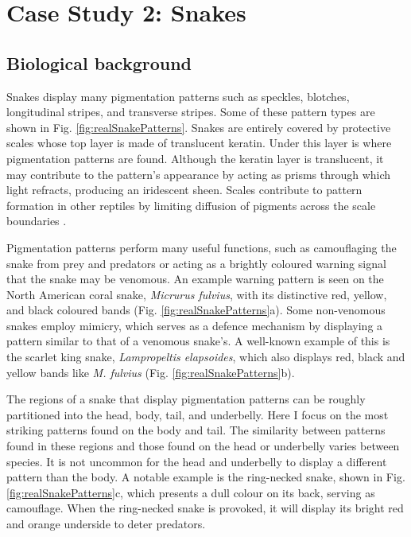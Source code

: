 \chapter{Case Study 2: Snakes}
\section{Biological background}
Snakes display many pigmentation patterns such as speckles, blotches, longitudinal stripes, and transverse stripes. Some of these pattern types are shown in Fig. \ref{fig:realSnakePatterns}. Snakes are entirely covered by protective scales whose top layer is made of translucent keratin. Under this layer is where pigmentation patterns are found. Although the keratin layer is translucent, it may contribute to the pattern's appearance by acting as prisms through which light refracts, producing an iridescent sheen. Scales contribute to pattern formation in other reptiles by limiting diffusion of pigments across the scale boundaries \citep{manukyan2017}.

Pigmentation patterns perform many useful functions, such as camouflaging the snake from prey and predators or acting as a brightly coloured warning signal that the snake may be venomous. An example warning pattern is seen on the North American coral snake, \textit{Micrurus fulvius}, with its distinctive red, yellow, and black coloured bands (Fig. \ref{fig:realSnakePatterns}a). Some non-venomous snakes employ mimicry, which serves as a defence mechanism by displaying a pattern similar to that of a venomous snake's. A well-known example of this is the scarlet king snake, \textit{Lampropeltis elapsoides}, which also displays red, black and yellow bands like \textit{M. fulvius} (Fig. \ref{fig:realSnakePatterns}b).

The regions of a snake that display pigmentation patterns can be roughly partitioned into the head, body, tail, and underbelly. Here I focus on the most striking patterns found on the body and tail. The similarity between patterns found in these regions and those found on the head or underbelly varies between species. It is not uncommon for the head and underbelly to display a different pattern than the body. A notable example is the ring-necked snake, shown in Fig. \ref{fig:realSnakePatterns}c, which presents a dull colour on its back, serving as camouflage. When the ring-necked snake is provoked, it will display its bright red and orange underside to deter predators.

